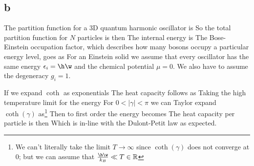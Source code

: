 \subsection*{b}
The partition function for a 3D quantum harmonic oscillator is
So the total partition function for $N$ particles is then
The internal energy is
The Bose-Einstein occupation factor, which describes how many bosons occupy a particular energy level, goes as
For an Einstein solid we assume that every oscillator has the same energy $\epsilon_i = \h\w$ and the chemical potential $\mu=0$. We also have to assume the degeneracy $g_i=1$.

If we expand $\coth$ as exponentials
The heat capacity follows as
Taking the high temperature limit for the energy
For $0<|\gamma| < \pi $ we can Taylor expand $\coth(\gamma)$ as\footnote{We can't literally take the limit $T\rightarrow\infty$ since $\coth(\gamma)$ does not converge at $0$; but we can assume that $\frac{\h\w}{k_B}\ll T \in \mathbb{R}$}
Then to first order the energy becomes
The heat capacity per particle is then
Which is in-line with the Dulont-Petit law as expected.
